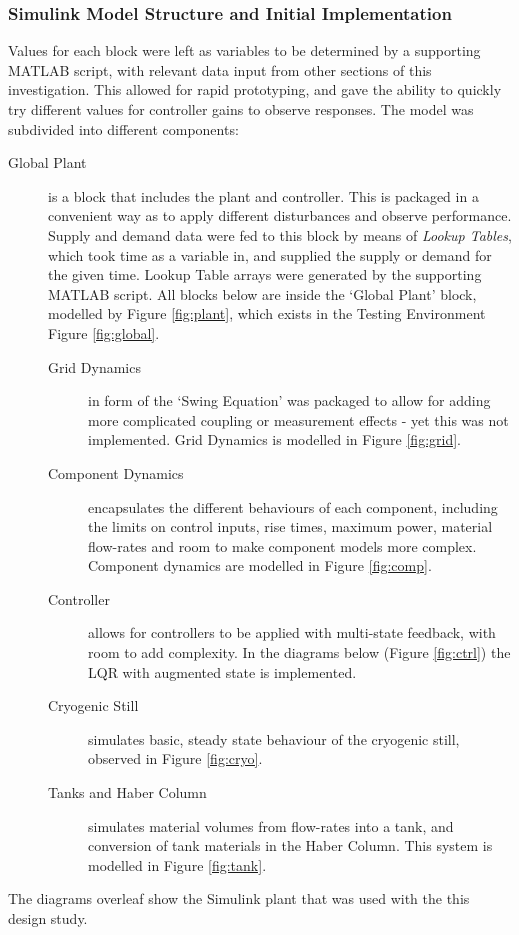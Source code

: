 \subsubsection{Simulink Model Structure and Initial Implementation}

Values for each block were left as variables to be determined by a supporting MATLAB script, with relevant data input from other sections of this investigation.
This allowed for rapid prototyping, and gave the ability to quickly try different values for controller gains to observe responses.
The model was subdivided into different components:
\begin{description}
\item[Global Plant]{ is a block that includes the plant and controller.
This is packaged in a convenient way as to apply different disturbances and observe performance.
Supply and demand data were fed to this block by means of \emph{Lookup Tables}, which took time as a variable in, and supplied the supply or demand for the given time. Lookup Table arrays were generated by the supporting MATLAB script.
All blocks below are inside the `Global Plant' block, modelled by Figure \ref{fig:plant}, which exists in the Testing Environment Figure \ref{fig:global}.}
\begin{description}
        \item[Grid Dynamics]{ in form of the `Swing Equation' was packaged to allow for adding more complicated coupling or measurement effects - yet this was not implemented. Grid Dynamics is modelled in Figure \ref{fig:grid}.}
        \item[Component Dynamics]{ encapsulates the different behaviours of each component, including the limits on control inputs, rise times, maximum power, material flow-rates and room to make component models more complex. Component dynamics are modelled in Figure \ref{fig:comp}.}
        \item[Controller]{ allows for controllers to be applied with multi-state feedback, with room to add complexity. In the diagrams below (Figure \ref{fig:ctrl}) the LQR with augmented state is implemented.}
        \item[Cryogenic Still]{ simulates basic, steady state behaviour of the cryogenic still, observed in Figure \ref{fig:cryo}.}
        \item[Tanks and Haber Column]{ simulates material volumes from flow-rates into a tank, and conversion of tank materials in the Haber Column. This system is modelled in Figure \ref{fig:tank}.}
\end{description}
\end{description}
The diagrams overleaf show the Simulink plant that was used with the this design study.

